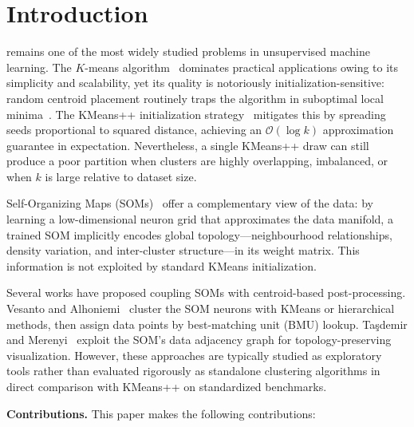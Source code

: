 \documentclass[journal]{IEEEtran}
\begin{document}
\section{Introduction}
\label{sec:introduction}

 remains one of the most widely studied problems in unsupervised machine learning. The $K$-means algorithm~\cite{macqueen1967some,lloyd1982least} dominates practical applications owing to its simplicity and scalability, yet its quality is notoriously initialization-sensitive: random centroid placement routinely traps the algorithm in suboptimal local minima~\cite{arthur2007kmeans}. The KMeans++ initialization strategy~\cite{arthur2007kmeans} mitigates this by spreading seeds proportional to squared distance, achieving an $\mathcal{O}(\log k)$ approximation guarantee in expectation. Nevertheless, a single KMeans++ draw can still produce a poor partition when clusters are highly overlapping, imbalanced, or when $k$ is large relative to dataset size.

Self-Organizing Maps (SOMs)~\cite{kohonen1982self,kohonen2001self} offer a complementary view of the data: by learning a low-dimensional neuron grid that approximates the data manifold, a trained SOM implicitly encodes global topology—neighbourhood relationships, density variation, and inter-cluster structure—in its weight matrix. This information is not exploited by standard KMeans initialization.

Several works have proposed coupling SOMs with centroid-based post-processing. Vesanto and Alhoniemi~\cite{vesanto2000clustering} cluster the SOM neurons with KMeans or hierarchical methods, then assign data points by best-matching unit (BMU) lookup. Taşdemir and Merenyi~\cite{tasdemir2009exploiting} exploit the SOM's data adjacency graph for topology-preserving visualization. However, these approaches are typically studied as exploratory tools rather than evaluated rigorously as standalone clustering algorithms in direct comparison with KMeans++ on standardized benchmarks.

\textbf{Contributions.} This paper makes the following contributions:
\end{document}
